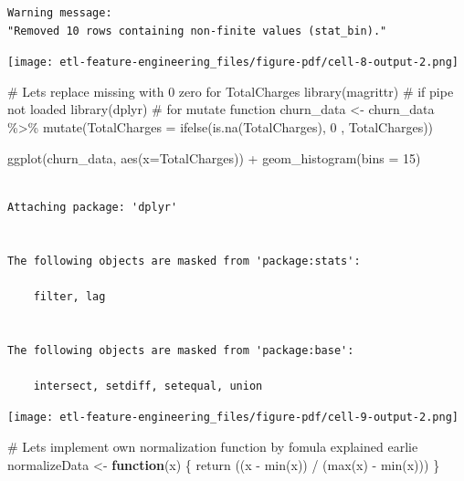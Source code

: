 \documentclass[
  letterpaper,
  DIV=11,
  numbers=noendperiod]{scrreprt}
\newenvironment{Shaded}{\begin{snugshade}}{\end{snugshade}}
\newcommand{\AttributeTok}[1]{\textcolor[rgb]{0.40,0.45,0.13}{#1}}
\newcommand{\CommentTok}[1]{\textcolor[rgb]{0.37,0.37,0.37}{#1}}
\newcommand{\ControlFlowTok}[1]{\textcolor[rgb]{0.00,0.23,0.31}{\textbf{#1}}}
\newcommand{\DecValTok}[1]{\textcolor[rgb]{0.68,0.00,0.00}{#1}}
\newcommand{\FunctionTok}[1]{\textcolor[rgb]{0.28,0.35,0.67}{#1}}
\newcommand{\NormalTok}[1]{\textcolor[rgb]{0.00,0.23,0.31}{#1}}
\newcommand{\OtherTok}[1]{\textcolor[rgb]{0.00,0.23,0.31}{#1}}
\newcommand{\SpecialCharTok}[1]{\textcolor[rgb]{0.37,0.37,0.37}{#1}}
\begin{document}
\begin{verbatim}
Warning message:
"Removed 10 rows containing non-finite values (stat_bin)."
\end{verbatim}

\texttt{[image: etl-feature-engineering\_files/figure-pdf/cell-8-output-2.png]}

\begin{Shaded}
\begin{Highlighting}[]
\CommentTok{\# Lets replace missing with 0 zero for TotalCharges }
\FunctionTok{library}\NormalTok{(magrittr) }\CommentTok{\# if pipe not loaded}
\FunctionTok{library}\NormalTok{(dplyr) }\CommentTok{\# for mutate function}
\NormalTok{churn\_data }\OtherTok{\textless{}{-}}\NormalTok{ churn\_data }\SpecialCharTok{\%\textgreater{}\%}
            \FunctionTok{mutate}\NormalTok{(}\AttributeTok{TotalCharges =} \FunctionTok{ifelse}\NormalTok{(}\FunctionTok{is.na}\NormalTok{(TotalCharges), }\DecValTok{0}\NormalTok{ , TotalCharges))}

\FunctionTok{ggplot}\NormalTok{(churn\_data, }\FunctionTok{aes}\NormalTok{(}\AttributeTok{x=}\NormalTok{TotalCharges)) }\SpecialCharTok{+} \FunctionTok{geom\_histogram}\NormalTok{(}\AttributeTok{bins =} \DecValTok{15}\NormalTok{)}
\end{Highlighting}
\end{Shaded}

\begin{verbatim}

Attaching package: 'dplyr'


The following objects are masked from 'package:stats':

    filter, lag


The following objects are masked from 'package:base':

    intersect, setdiff, setequal, union

\end{verbatim}

\texttt{[image: etl-feature-engineering\_files/figure-pdf/cell-9-output-2.png]}

\begin{Shaded}
\begin{Highlighting}[]
\CommentTok{\# Lets implement own normalization function by fomula explained earlie}
\NormalTok{normalizeData }\OtherTok{\textless{}{-}} \ControlFlowTok{function}\NormalTok{(x) \{}
    \FunctionTok{return}\NormalTok{ ((x }\SpecialCharTok{{-}} \FunctionTok{min}\NormalTok{(x)) }\SpecialCharTok{/}\NormalTok{ (}\FunctionTok{max}\NormalTok{(x) }\SpecialCharTok{{-}} \FunctionTok{min}\NormalTok{(x)))}
\NormalTok{\}}
\end{Highlighting}
\end{Shaded}
\end{document}
